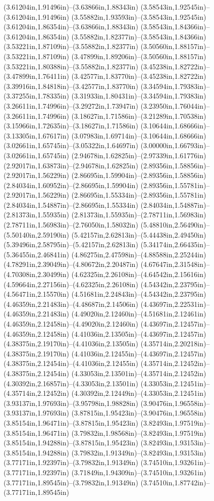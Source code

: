 (3.61204in,1.91496in)--(3.63866in,1.88343in) (3.58543in,1.92545in)--(3.61204in,1.91496in) (3.55882in,1.93593in)--(3.58543in,1.92545in) (3.61204in,1.86354in)--(3.63866in,1.88343in) (3.58543in,1.84366in)--(3.61204in,1.86354in) (3.55882in,1.82377in)--(3.58543in,1.84366in) (3.53221in,1.87109in)--(3.55882in,1.82377in) (3.50560in,1.88157in)--(3.53221in,1.87109in) (3.47899in,1.89206in)--(3.50560in,1.88157in) (3.53221in,1.80388in)--(3.55882in,1.82377in) (3.45238in,1.82722in)--(3.47899in,1.76411in) (3.42577in,1.83770in)--(3.45238in,1.82722in) (3.39916in,1.84818in)--(3.42577in,1.83770in) (3.34594in,1.79383in)--(3.37255in,1.78335in) (3.31933in,1.80431in)--(3.34594in,1.79383in) (3.26611in,1.74996in)--(3.29272in,1.73947in) (3.23950in,1.76044in)--(3.26611in,1.74996in) (3.18627in,1.71586in)--(3.21289in,1.70538in) (3.15966in,1.72635in)--(3.18627in,1.71586in) (3.10644in,1.68666in)--(3.13305in,1.67617in) (3.07983in,1.69714in)--(3.10644in,1.68666in) (3.02661in,1.65745in)--(3.05322in,1.64697in) (3.00000in,1.66793in)--(3.02661in,1.65745in) (2.94678in,1.62825in)--(2.97339in,1.61776in) (2.92017in,1.63873in)--(2.94678in,1.62825in) (2.89356in,1.58856in)--(2.92017in,1.56229in) (2.86695in,1.59904in)--(2.89356in,1.58856in) (2.84034in,1.60952in)--(2.86695in,1.59904in) (2.89356in,1.55781in)--(2.92017in,1.56229in) (2.86695in,1.55334in)--(2.89356in,1.55781in) (2.84034in,1.54887in)--(2.86695in,1.55334in) (2.84034in,1.54887in)--(2.81373in,1.55935in) (2.81373in,1.55935in)--(2.78711in,1.56983in) (2.78711in,1.56983in)--(2.76050in,1.58032in) (5.48810in,2.56490in)--(5.50140in,2.59190in) (5.42157in,2.62813in)--(5.44438in,2.49450in) (5.39496in,2.58795in)--(5.42157in,2.62813in) (5.34174in,2.66435in)--(5.36455in,2.46841in) (4.86275in,2.47598in)--(4.88588in,2.25244in) (4.78291in,2.39049in)--(4.80672in,2.20487in) (4.67647in,2.31548in)--(4.70308in,2.30499in) (4.62325in,2.26108in)--(4.64542in,2.15616in) (4.59664in,2.27156in)--(4.62325in,2.26108in) (4.54342in,2.23795in)--(4.56471in,2.15570in) (4.51681in,2.24843in)--(4.54342in,2.23795in) (4.46359in,2.21483in)--(4.48687in,2.14506in) (4.43697in,2.22531in)--(4.46359in,2.21483in) (4.49020in,2.12460in)--(4.51681in,2.12461in) (4.46359in,2.12458in)--(4.49020in,2.12460in) (4.43697in,2.12457in)--(4.46359in,2.12458in) (4.41036in,2.13505in)--(4.43697in,2.12457in) (4.38375in,2.19170in)--(4.41036in,2.13505in) (4.35714in,2.20218in)--(4.38375in,2.19170in) (4.41036in,2.12455in)--(4.43697in,2.12457in) (4.38375in,2.12454in)--(4.41036in,2.12455in) (4.35714in,2.12452in)--(4.38375in,2.12454in) (4.33053in,2.13501in)--(4.35714in,2.12452in) (4.30392in,2.16857in)--(4.33053in,2.13501in) (4.33053in,2.12451in)--(4.35714in,2.12452in) (4.30392in,2.12449in)--(4.33053in,2.12451in) (3.93137in,1.97693in)--(3.95798in,1.98828in) (3.90476in,1.96558in)--(3.93137in,1.97693in) (3.87815in,1.95423in)--(3.90476in,1.96558in) (3.85154in,1.96471in)--(3.87815in,1.95423in) (3.82493in,1.97519in)--(3.85154in,1.96471in) (3.79832in,1.98568in)--(3.82493in,1.97519in) (3.85154in,1.94288in)--(3.87815in,1.95423in) (3.82493in,1.93153in)--(3.85154in,1.94288in) (3.79832in,1.91349in)--(3.82493in,1.93153in) (3.77171in,1.92397in)--(3.79832in,1.91349in) (3.74510in,1.93261in)--(3.77171in,1.92397in) (3.71849in,1.94309in)--(3.74510in,1.93261in) (3.77171in,1.89545in)--(3.79832in,1.91349in) (3.74510in,1.87742in)--(3.77171in,1.89545in) 